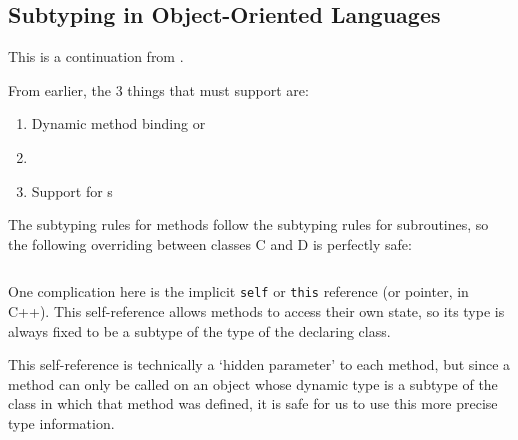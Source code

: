 \subsection{Subtyping in Object-Oriented Languages}\label{subsec:Subtyping_Object_Oriented_Languages}
This is a continuation from .

From earlier, the 3 things that  must support are:
\begin{enumerate}[noitemsep]
\item Dynamic method binding or \emph{}
\item {}
\item Support for s
\end{enumerate}

The subtyping rules for methods follow the subtyping rules for subroutines, so the following overriding between classes C and D is perfectly safe:
\inputminted[frame=lines,linenos]{java}{./EDAP05-Concepts_Programming_Languages-Sections/Object_Oriented_Programming/Code/MethodSubtyping.java}

One complication here is the implicit \texttt{self} or \texttt{this} reference (or pointer, in C++).
This self-reference allows methods to access their own state, so its type is always fixed to be a subtype of the type of the declaring class.

This self-reference is technically a ‘hidden parameter’ to each method, but since a method can only be called on an object whose dynamic type is a subtype of the class in which that method was defined, it is safe for us to use this more precise type information.

